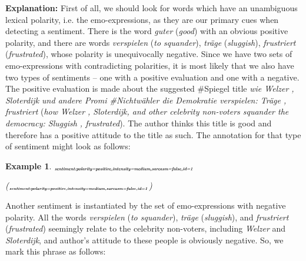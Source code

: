 \documentclass[11pt,a4paper]{article}
\theoremstyle{mytheoremstyle}
\newtheorem*{exmp*}{Example}
\newcommand{\mtag}[2]{{\upshape[\emph{#2}\upshape]$_{\textrm{\bfseries\emph{\tiny
        #1}}}$}}
\newcommand{\sentiment}[2][]{\mtag{sen\-ti\-ment\ifstrempty{#1}{}{:#1}}{#2}}
\newcommand{\source}[2][]{\mtag{source\ifstrempty{#1}{}{:#1}}{#2}}
\newcommand{\target}[2][]{\mtag{tar\-get\ifstrempty{#1}{}{:#1}}{#2}}
\newcommand{\emoexpression}[2][]{\mtag{emo-\-ex\-pression\ifstrempty{#1}{}{:#1}}{#2}}
\begin{document}
\textbf{Explanation:} First of all, we should look for words which
have an unambiguous lexical polarity, i.e. the emo-expressions, as
they are our primary cues when detecting a sentiment.  There is the
word \textit{guter} (\textit{good}) with an obvious positive polarity,
and there are words \textit{verspielen} (\textit{to squander}),
\textit{tr\"age} (\textit{sluggish}), \textit{frustriert}
(\textit{frustrated}), whose polarity is unequivocally negative.
Since we have two sets of emo-expressions with contradicting
polarities, it is most likely that we also have two types of
sentiments -- one with a positive evaluation and one with a negative.
The positive evaluation is made about the suggested \#Spiegel title
\textit{wie Welzer , Sloterdijk und andere Promi \#Nichtw\"ahler die
  Demokratie verspielen: Tr\"age , frustriert} (\textit{how Welzer ,
  Sloterdijk, and other celebrity non-voters squander the democracy:
  Sluggish , frustrated}).  The author thinks this title is good and
therefore has a positive attitude to the title as such.  The
annotation for that type of sentiment might look as follows:

\begin{exmp*}
  \footnotesize
  \sentiment[polarity=positive,intensity=medium,sarcasm=false,id=1]{RT
    \source[sentiment\_ref=1]{@JochenFlasbarth} :
    \emoexpression[polarity=positive,intensity=medium,sarcasm=false,
      sentiment\_ref=1]{Guter} \#Spiegel-Titel ,
    \target[sentiment\_ref=1]{wie Welzer , Sloterdijk und andere Promi
      \#Nichtw\"ahler die Demokratie verspielen : Tr\"age ,
      frustriert}}

  {\scriptsize(\sentiment[polarity=positive,intensity=medium,sarcasm=false,id=1]{RT
      \source[sentiment\_ref=1]{@JochenFlasbarth} : A
      \emoexpression[polarity=positive,intensity=medium,sarcasm=false,
        sentiment\_ref=1]{good} \#Spiegel title ,
      \target[sentiment\_ref=1]{how Welzer , Sloterdijk, and other
        celebrity non-voters squander the democracy : Sluggish ,
        frustrated}})}
\end{exmp*}

Another sentiment is instantiated by the set of emo-expressions with
negative polarity.  All the words \textit{verspielen} (\textit{to
  squander}), \textit{tr\"age} (\textit{sluggish}), and
\textit{frustriert} (\textit{frustrated}) seemingly relate to the
celebrity non-voters, including \textit{Welzer} and
\textit{Sloterdijk}, and author's attitude to these people is
obviously negative.  So, we mark this phrase as follows:
\end{document}
